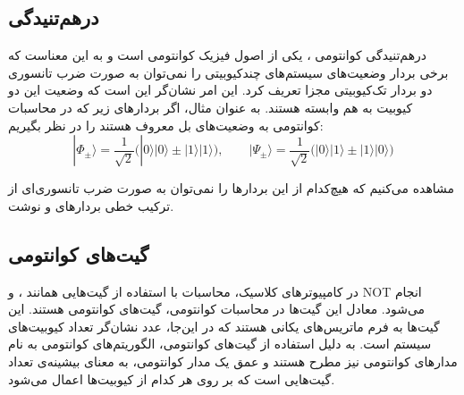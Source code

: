 \subsection{درهم‌تنیدگی}

درهم‌تنیدگی کوانتومی
، یکی از اصول فیزیک کوانتومی است و به این معناست که برخی بردار وضعیت‌های سیستم‌های چندکیوبیتی را نمی‌توان به صورت ضرب تانسوری دو بردار تک‌کیوبیتی مجزا تعریف کرد. این امر نشان‌گر این است که وضعیت این دو کیوبیت به هم وابسته هستند.
به عنوان مثال، اگر بردارهای زیر که در محاسبات کوانتومی به وضعیت‌های بل 
معروف هستند را در نظر بگیریم:
\begin{equation}
|{\Phi_\pm}\rangle = \frac{1}{\sqrt 2}\big(|0\rangle| 0\rangle\pm |1\rangle| 1\rangle\big), \qquad |{\Psi_{\pm}}\rangle=\frac{1}{\sqrt 2}\big(|0\rangle| 1\rangle\pm  |1\rangle|0\rangle\big)
\end{equation}

مشاهده می‌کنیم که هیچ‌کدام از این بردارها را نمی‌توان به صورت ضرب تانسوری‌ای از ترکیب خطی بردارهای
\lr{$|0\rangle$} و \lr{$|1\rangle$}
نوشت.

\subsection{گیت‌های کوانتومی}
در کامپیوترهای کلاسیک، محاسبات با استفاده از گیت‌هایی همانند 
،  و NOT
انجام می‌شود.
معادل این گیت‌ها در محاسبات کوانتومی، گیت‌های کوانتومی هستند. این گیت‌ها به فرم ماتریس‌های یکانی 
هستند که در این‌جا، عدد 
نشان‌گر تعداد کیوبیت‌های سیستم است.
به دلیل استفاده از گیت‌های کوانتومی، الگوریتم‌های کوانتومی به نام مدارهای کوانتومی نیز مطرح هستند و عمق یک مدار کوانتومی، به معنای بیشینه‌ی تعداد گیت‌هایی است که بر روی هر کدام از کیوبیت‌ها اعمال می‌شود.

